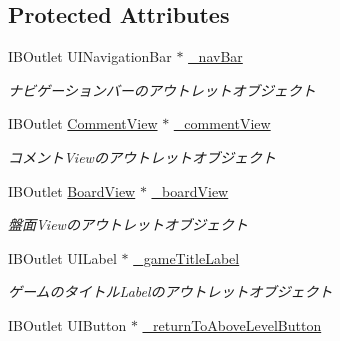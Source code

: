 \subsection*{Protected Attributes}
\begin{DoxyCompactItemize}
\item 
\hypertarget{interface_abstract_record_view_controller_a13dde1eb5f4219b5969cd4ee21f290c7}{
IBOutlet UINavigationBar $\ast$ \hyperlink{interface_abstract_record_view_controller_a13dde1eb5f4219b5969cd4ee21f290c7}{\_\-navBar}}
\label{interface_abstract_record_view_controller_a13dde1eb5f4219b5969cd4ee21f290c7}

\begin{DoxyCompactList}\small\item\em ナビゲーションバーのアウトレットオブジェクト \end{DoxyCompactList}\item 
\hypertarget{interface_abstract_record_view_controller_a21fc7774c20031d2e61e5641da05771a}{
IBOutlet \hyperlink{interface_comment_view}{CommentView} $\ast$ \hyperlink{interface_abstract_record_view_controller_a21fc7774c20031d2e61e5641da05771a}{\_\-commentView}}
\label{interface_abstract_record_view_controller_a21fc7774c20031d2e61e5641da05771a}

\begin{DoxyCompactList}\small\item\em コメントViewのアウトレットオブジェクト \end{DoxyCompactList}\item 
\hypertarget{interface_abstract_record_view_controller_a7561ef44a265422a44b80e4e06e6432d}{
IBOutlet \hyperlink{interface_board_view}{BoardView} $\ast$ \hyperlink{interface_abstract_record_view_controller_a7561ef44a265422a44b80e4e06e6432d}{\_\-boardView}}
\label{interface_abstract_record_view_controller_a7561ef44a265422a44b80e4e06e6432d}

\begin{DoxyCompactList}\small\item\em 盤面Viewのアウトレットオブジェクト \end{DoxyCompactList}\item 
\hypertarget{interface_abstract_record_view_controller_aa5366410d1844c2b0635e914c09d2748}{
IBOutlet UILabel $\ast$ \hyperlink{interface_abstract_record_view_controller_aa5366410d1844c2b0635e914c09d2748}{\_\-gameTitleLabel}}
\label{interface_abstract_record_view_controller_aa5366410d1844c2b0635e914c09d2748}

\begin{DoxyCompactList}\small\item\em ゲームのタイトルLabelのアウトレットオブジェクト \end{DoxyCompactList}\item 
\hypertarget{interface_abstract_record_view_controller_a80f03fc22b3a42dbb18be8f35ac17792}{
IBOutlet UIButton $\ast$ \hyperlink{interface_abstract_record_view_controller_a80f03fc22b3a42dbb18be8f35ac17792}{\_\-returnToAboveLevelButton}}
\label{interface_abstract_record_view_controller_a80f03fc22b3a42dbb18be8f35ac17792}


\end{DoxyCompactItemize}
